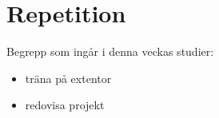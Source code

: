 \chapter{Repetition}\label{chapter:W13}
Begrepp som ingår i denna veckas studier:
\begin{itemize}[noitemsep,label={$\square$},leftmargin=*]
\item träna på extentor
\item redovisa projekt\end{itemize}
